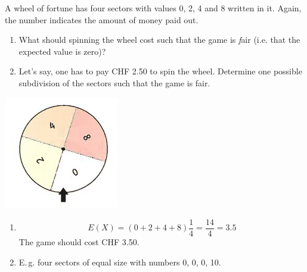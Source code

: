 \documentclass[twoside,11pt,a4paper]{article}
\newif\ifEN \ENtrue	                %
\def\tr|#1|#2|{\ifEN #2\else #1\fi}     %
\theoremstyle{definition}
\newcounter{exc}
\def\answerline#1{%
   \ifhmode\\[1ex]\fcolorbox{solbox}{solbox}{\hbox to \linewidth{\vbox to #1\baselineskip{}}}%
   \else\fcolorbox{solbox}{solbox}{\hbox to \linewidth{\vbox to #1\baselineskip{}}}%
   \fi
 }
\begin{document}
\begin{exc}
\tr|Ein Gl"ucksrad hat 4 gleichgrosse Sektoren in den die jeweiligen Gewinne  0,2,4 und 8 stehen.
   |A wheel of fortune has four sectors with values 0, 2, 4 and 8 written in it. Again, the number indicates the amount of money paid out. |
\begin{enumerate}
\item 
\tr|Welchen Betrag sollte es kosten, das Gl"ucksrad zu drehen, damit das Spiel \emph{fair} ist, d. h. Erwartungswert 0 hat?
   |What should spinning the wheel cost such that the game is \emph{fair} (i.e. that the expected value is zero)?|
\item 
\tr|Nehmen wir an, es koste CHF 2.50 das Gl"ucksrad zu drehen. Finden Sie eine m"ogliche Aufteilung der Sektoren, so dass das Spiel fair ist. 
   |Let's say, one has to pay CHF 2.50 to spin the wheel. Determine one possible subdivision of the sectors such that the game is fair. |
\end{enumerate}
\begin{center}
\includegraphics[width=5cm]{Wheel2}
\end{center}
\end{exc}
\begin{Answer}
  \begin{enumerate}
  \item
    \[
      E(X)=(0+2+4+8)\frac14=\frac{14}4=3.5
    \]
    \tr|Das Spiel sollte CHF 3.50 kosten.|The game should cost CHF 3.50.|
  \item
    \tr|Z.\,B. vier gleichgrosse Sektoren mit der Belegung 0, 0, 0, 10.|
        E.\,g. four sectors of equal size with numbers 0, 0, 0, 10.|
  \end{enumerate}
\end{Answer}
\answerline{12}
\end{document}
